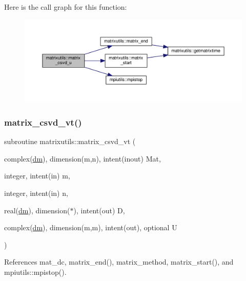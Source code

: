 Here is the call graph for this function\+:
\nopagebreak
\begin{figure}[H]
\begin{center}
\leavevmode
\includegraphics[width=350pt]{namespacematrixutils_af38c4627b0e939eadba68b6ea264297b_cgraph}
\end{center}
\end{figure}
\mbox{\label{namespacematrixutils_a536eb03269736dd2f4c33b0978211583}} 
\subsubsection{\texorpdfstring{matrix\+\_\+csvd\+\_\+vt()}{matrix\_csvd\_vt()}}
{\footnotesize\ttfamily subroutine matrixutils\+::matrix\+\_\+csvd\+\_\+vt (\begin{DoxyParamCaption}\item[{complex(\mbox{\hyperlink{namespacematrixutils_a7bdc564986ea4d90f51201c75606ef3d}{dm}}), dimension(m,n), intent(inout)}]{Mat,  }\item[{integer, intent(in)}]{m,  }\item[{integer, intent(in)}]{n,  }\item[{real(\mbox{\hyperlink{namespacematrixutils_a7bdc564986ea4d90f51201c75606ef3d}{dm}}), dimension($\ast$), intent(out)}]{D,  }\item[{complex(\mbox{\hyperlink{namespacematrixutils_a7bdc564986ea4d90f51201c75606ef3d}{dm}}), dimension(m,m), intent(out), optional}]{U }\end{DoxyParamCaption})}



References mat\+\_\+dc, matrix\+\_\+end(), matrix\+\_\+method, matrix\+\_\+start(), and mpiutils\+::mpistop().

